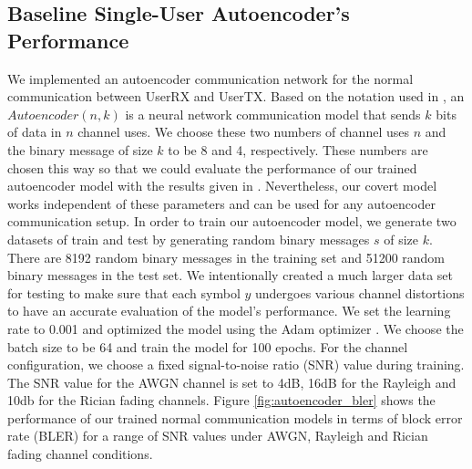 \subsection{Baseline Single-User Autoencoder's Performance}
We implemented an autoencoder communication network for the normal communication between UserRX and UserTX. Based on the notation used in \cite{o2017introduction}, an \(Autoencoder (n, k)\) is a neural network communication model that sends \(k\) bits of data in \(n\) channel uses. We choose these two numbers of channel uses \(n\) and the binary message of size \(k\) to be 8 and 4, respectively. These numbers are chosen this way so that we could evaluate the performance of our trained autoencoder model with the results given in \cite{o2017introduction}. Nevertheless, our covert model works independent of these parameters and can be used for any autoencoder communication setup. In order to train our autoencoder model, we generate two datasets of train and test by generating random binary messages \(s\) of size \(k\). There are 8192 random binary messages in the training set and 51200 random binary messages in the test set. We intentionally created a much larger data set for testing to make sure that each symbol \(y\) undergoes various channel distortions to have an accurate evaluation of the model's performance. We set the learning rate to 0.001 and optimized the model using the Adam optimizer \cite{kingma2014adam}. We choose the batch size to be 64 and train the model for 100 epochs. For the channel configuration, we choose a fixed signal-to-noise ratio (SNR) value during training. The SNR value for the AWGN channel is set to 4dB, 16dB for the Rayleigh and 10db for the Rician fading channels. Figure \ref{fig:autoencoder_bler} shows the performance of our trained normal communication models in terms of block error rate (BLER) for a range of SNR values under AWGN, Rayleigh and Rician fading channel conditions.


